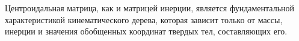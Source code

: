 Центроидальная матрица, как и матрицей инерции, является фундаментальной характеристикой кинематического дерева, которая зависит только от массы, инерции и значения обобщенных координат твердых тел, составляющих его.






